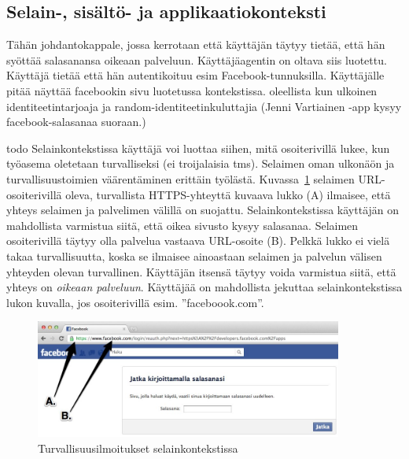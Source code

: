 \documentclass[finnish,gradu]{tktltiki}
\begin{document}



  \subsection{Selain-, sisältö- ja applikaatiokonteksti} %
  \label{sub:selainkonteksti_vs_applikaatiokonteksti}

  Tähän johdantokappale, jossa kerrotaan että käyttäjän täytyy tietää, että hän syöttää salasanansa oikeaan palveluun. Käyttäjäagentin on oltava siis luotettu. Käyttäjä tietää että hän autentikoituu esim Facebook-tunnuksilla. Käyttäjälle pitää näyttää facebookin sivu luotetussa kontekstissa. oleellista kun ulkoinen identiteetintarjoaja ja random-identiteetinkuluttajia (Jenni Vartiainen -app kysyy facebook-salasanaa suoraan.)

  todo
  Selainkontekstissa käyttäjä voi luottaa siihen, mitä osoiterivillä lukee, kun työasema oletetaan turvalliseksi (ei troijalaisia tms). Selaimen oman ulkonäön ja turvallisuustoimien väärentäminen erittäin työlästä. Kuvassa~\ref{fig:facebook_reauth_ab} selaimen URL-osoiterivillä oleva, turvallista HTTPS-yhteyttä kuvaava lukko (A) ilmaisee, että yhteys selaimen ja palvelimen välillä on suojattu. Selainkontekstissa käyttäjän on mahdollista varmistua siitä, että oikea sivusto kysyy salasanaa. Selaimen osoiterivillä täytyy olla palvelua vastaava URL-osoite (B). Pelkkä lukko ei vielä takaa turvallisuutta, koska se ilmaisee ainoastaan selaimen ja palvelun välisen yhteyden olevan turvallinen. Käyttäjän itsensä täytyy voida varmistua siitä, että yhteys on \emph{oikeaan palveluun}. Käyttäjää on mahdollista jekuttaa selainkontekstissa lukon kuvalla, jos osoiterivillä esim. ''faceboook.com''.

  \begin{figure}
    \centering
    \includegraphics[width=0.9\textwidth]{images/Facebook_reauth_ab.jpg}
    \caption{Turvallisuusilmoitukset selainkontekstissa}
    \label{fig:facebook_reauth_ab}
  \end{figure}
\end{document}
